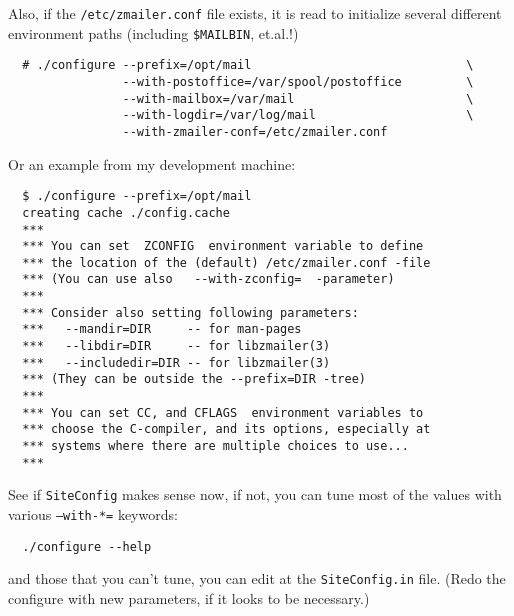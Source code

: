 Also, if the {\tt /etc/zmailer.conf} file exists, it is read
to initialize several different environment paths (including
{\tt \$MAILBIN}, et.al.!)

\begin{verbatim}
  # ./configure --prefix=/opt/mail                              \
                --with-postoffice=/var/spool/postoffice         \
                --with-mailbox=/var/mail                        \
                --with-logdir=/var/log/mail                     \
                --with-zmailer-conf=/etc/zmailer.conf
\end{verbatim}

Or an example from my development machine:
\begin{verbatim}
  $ ./configure --prefix=/opt/mail
  creating cache ./config.cache
  ***
  *** You can set  ZCONFIG  environment variable to define
  *** the location of the (default) /etc/zmailer.conf -file
  *** (You can use also   --with-zconfig=  -parameter)
  ***
  *** Consider also setting following parameters:
  ***   --mandir=DIR     -- for man-pages
  ***   --libdir=DIR     -- for libzmailer(3)
  ***   --includedir=DIR -- for libzmailer(3)
  *** (They can be outside the --prefix=DIR -tree)
  ***
  *** You can set CC, and CFLAGS  environment variables to
  *** choose the C-compiler, and its options, especially at
  *** systems where there are multiple choices to use...
  ***
\end{verbatim}

See if {\tt SiteConfig} makes sense now, if not, you can tune
most of the values with various {\tt --with-*=} keywords:
\begin{verbatim}
  ./configure --help
\end{verbatim}

and those that you can't tune, you can edit at the {\tt SiteConfig.in}
file.  (Redo the configure with new parameters, if it looks to be
necessary.)

